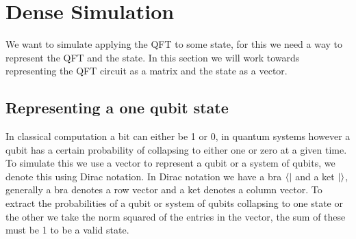\section{Dense Simulation}\label{sec:dense}
We want to simulate applying the QFT to some state, for this we need a way to represent the QFT and the state. 
In this section we will work towards representing the QFT circuit as a matrix and the state as a vector. 
\subsection{Representing a one qubit state}
In classical computation a bit can either be 1 or 0, in quantum systems however a qubit has a certain probability of collapsing to either one or zero at a given time.
To simulate this we use a vector to represent a qubit or a system of qubits, we denote this using Dirac notation. In Dirac notation we have a bra $\bra{}$ and a ket $\ket{}$, generally a bra denotes a row vector and a ket denotes a column vector.
To extract the probabilities of a qubit or system of qubits collapsing to one state or the other we take the norm squared of the entries in the vector, the sum of these must be 1 to be a valid state.
\newcommand{\qo}{\begin{bmatrix}
        0\\
        1\\
    \end{bmatrix}}
\newcommand{\qz}{\begin{bmatrix}
        1\\
        0\\
    \end{bmatrix}}
\newcommand{\qp}{\begin{bmatrix}
        \sqrt{0.5}\\
        \sqrt{0.5}\\
    \end{bmatrix}}
\newcommand{\qm}{\begin{bmatrix}
        \sqrt{0.5}\\
        -\sqrt{0.5}\\
    \end{bmatrix}}
    
